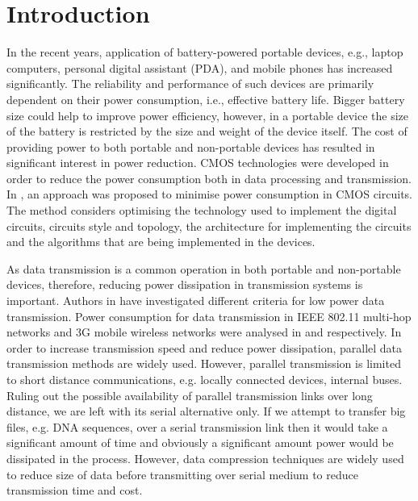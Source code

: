 \documentclass[preprint,12pt]{elsarticle}
\begin{document}

\section{Introduction}
In the recent years, application of battery-powered portable devices, e.g., laptop computers, personal digital assistant (PDA),  and mobile phones has increased significantly. The reliability and performance of such devices are primarily dependent  on their power consumption, i.e., effective battery life. Bigger battery size could help to improve power efficiency, however, in a portable device the size of the battery is restricted by the size and weight of the device itself. The cost of providing power to both portable and non-portable devices has resulted in significant interest in power reduction. CMOS technologies were developed in order to reduce the power consumption both in data processing and transmission. In \cite{chandrakasan1995}, an approach was proposed to minimise power consumption in CMOS circuits. The method considers optimising the technology used to implement the digital circuits, circuits style and topology, the architecture for implementing the circuits and the algorithms that are being implemented in the devices.

As data transmission is a common operation in both portable and non-portable devices, therefore, reducing power dissipation in transmission systems is important. Authors in \cite{Gregori2004,Yates04} have investigated different criteria for low power data transmission. Power consumption for data transmission in IEEE 802.11 multi-hop networks and 3G mobile wireless networks were analysed in \cite{Le11} and \cite{toorisaka12} respectively.  In order to increase transmission speed and reduce power dissipation, parallel data transmission methods are widely used. However, parallel transmission is limited to short distance communications, e.g. locally connected devices, internal buses. Ruling out the possible availability of parallel transmission links over long distance, we are left with its serial alternative only. If we attempt to transfer big files, e.g. DNA sequences, over a serial transmission link then it would take a significant amount of time and obviously a significant amount power would be dissipated in the process. However, data compression techniques are widely used to reduce size of data before transmitting over serial medium to reduce transmission time and cost.
\end{document}
